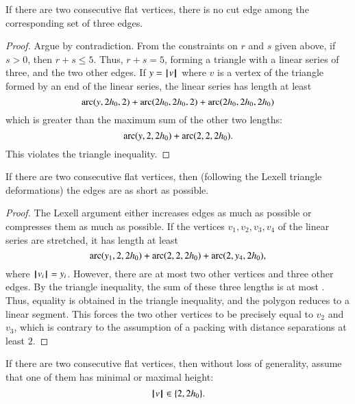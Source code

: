 \begin{lemma}
If there are two consecutive flat vertices, there is no cut edge among the corresponding set of three edges.
\end{lemma}

\begin{proof}  Argue by contradiction.  From the constraints on $r$ and $s$ given above, if $s>0$, then $r+s\le 5$.  Thus, $r+s=5$, forming a triangle with a linear series of three, and the two other edges.  If $y={{\hskip0.1em|\hskip-0.15em|\hskip0.1em}v{\hskip0.1em|\hskip-0.15em|\hskip0.1em}}$ where $v$ is a vertex of the triangle formed by an end of the linear series, the linear series has length at least
$$
\operatorname{arc}(y,2{h_0},2)+\operatorname{arc}(2{h_0},2{h_0},2) +\operatorname{arc}(2{h_0},2{h_0},2{h_0})
$$
which is greater than the maximum sum of the other two lengths:
$$
\operatorname{arc}(y,2,2{h_0})+\operatorname{arc}(2,2,2{h_0}).
$$
This violates the triangle inequality.
\end{proof}

\begin{lemma}  If there are two consecutive flat vertices, then (following the Lexell triangle deformations) the edges are as short as possible.
\end{lemma}

\begin{proof} The Lexell argument either increases edges as much as possible or compresses them as much as possible.  If the vertices $v_1,v_2,v_3,v_4$ of the linear series are stretched, it has length at least
\begin{equation}\label{eqn:3side}
\operatorname{arc}(y_1,2,2{h_0})+\operatorname{arc}(2,2,2{h_0})+\operatorname{arc}(2,y_4,2{h_0}),
\end{equation}
where ${{\hskip0.1em|\hskip-0.15em|\hskip0.1em}v_i{\hskip0.1em|\hskip-0.15em|\hskip0.1em}}=y_i$.
However, there are at most two other vertices and three other edges.  By the triangle inequality, the sum of these three lengths is at most .
Thus, equality is obtained in the triangle inequality, and the polygon reduces to a linear segment.  This forces the two other vertices to be precisely equal to $v_2$ and $v_3$, which is contrary to the assumption of a packing with distance separations at least $2$.
\end{proof}

\begin{lemma} If there are two consecutive flat vertices, then without loss of generality,  assume that one of them has minimal or maximal height:
$${{\hskip0.1em|\hskip-0.15em|\hskip0.1em}v{\hskip0.1em|\hskip-0.15em|\hskip0.1em}}\in \{2,2{h_0}\}.$$
\end{lemma}

